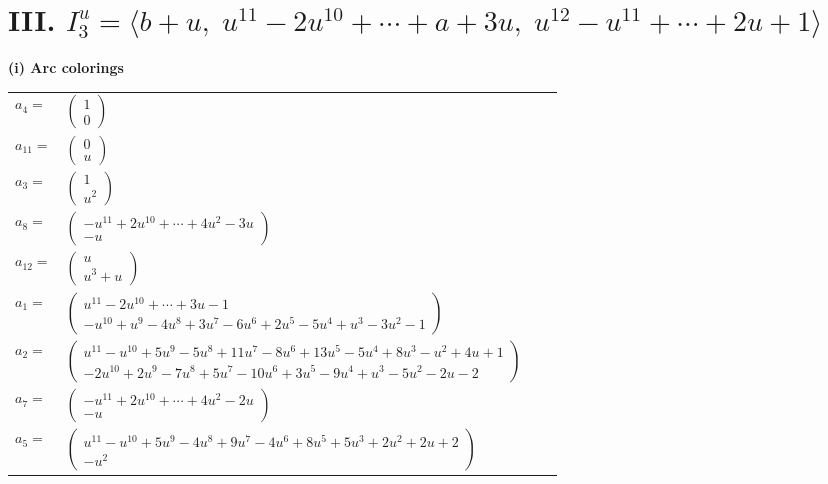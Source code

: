 \documentclass[1p]{elsarticle_modified}
\theoremstyle{definition}
\begin{document}
\centering \section*{III. $I^u_{3}= \langle b+u,\;u^{11}-2 u^{10}+\cdots+a+3 u,\;u^{12}- u^{11}+\cdots+2 u+1 \rangle$}
\flushleft \textbf{(i) Arc colorings}\\
\begin{tabular}{m{7pt} m{180pt} m{7pt} m{180pt} }
\flushright $a_{4}=$&$\begin{pmatrix}1\\0\end{pmatrix}$ \\
\flushright $a_{11}=$&$\begin{pmatrix}0\\u\end{pmatrix}$ \\
\flushright $a_{3}=$&$\begin{pmatrix}1\\u^2\end{pmatrix}$ \\
\flushright $a_{8}=$&$\begin{pmatrix}- u^{11}+2 u^{10}+\cdots+4 u^2-3 u\\- u\end{pmatrix}$ \\
\flushright $a_{12}=$&$\begin{pmatrix}u\\u^3+u\end{pmatrix}$ \\
\flushright $a_{1}=$&$\begin{pmatrix}u^{11}-2 u^{10}+\cdots+3 u-1\\- u^{10}+u^9-4 u^8+3 u^7-6 u^6+2 u^5-5 u^4+u^3-3 u^2-1\end{pmatrix}$ \\
\flushright $a_{2}=$&$\begin{pmatrix}u^{11}- u^{10}+5 u^9-5 u^8+11 u^7-8 u^6+13 u^5-5 u^4+8 u^3- u^2+4 u+1\\-2 u^{10}+2 u^9-7 u^8+5 u^7-10 u^6+3 u^5-9 u^4+u^3-5 u^2-2 u-2\end{pmatrix}$ \\
\flushright $a_{7}=$&$\begin{pmatrix}- u^{11}+2 u^{10}+\cdots+4 u^2-2 u\\- u\end{pmatrix}$ \\
\flushright $a_{5}=$&$\begin{pmatrix}u^{11}- u^{10}+5 u^9-4 u^8+9 u^7-4 u^6+8 u^5+5 u^3+2 u^2+2 u+2\\- u^2\end{pmatrix}$ \\

\end{tabular}
\end{document}
